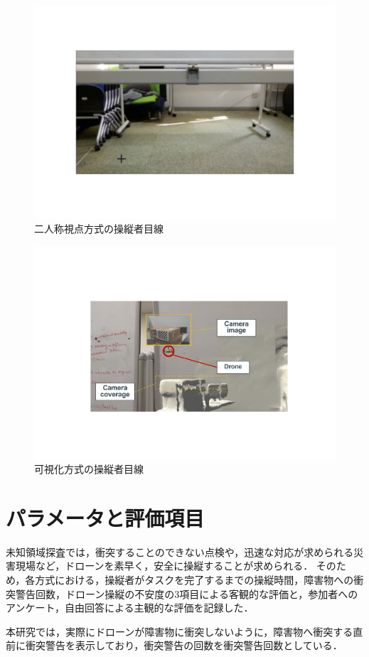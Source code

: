 \documentclass[a4paper,11pt]{ujreport}
\begin{document}
\begin{figure}[!tb]
  \centering
  \includegraphics[width=0.7\linewidth]{img/05_fpv.pdf}
  \caption{二人称視点方式の操縦者目線}
  \label{fig:05_fpv}
\end{figure}

\begin{figure}[!tb]
  \centering
  \includegraphics[width=0.7\linewidth]{img/05_visualization.pdf}
  \caption{可視化方式の操縦者目線}
  \label{fig:05_visualization}
\end{figure}


\section{パラメータと評価項目}
\label{sec:Parametor}

未知領域探査では，衝突することのできない点検や，迅速な対応が求められる災害現場など，ドローンを素早く，安全に操縦することが求められる．
そのため，各方式における，操縦者がタスクを完了するまでの操縦時間，障害物への衝突警告回数，ドローン操縦の不安度の3項目による客観的な評価と，参加者へのアンケート，自由回答による主観的な評価を記録した．

本研究では，実際にドローンが障害物に衝突しないように，障害物へ衝突する直前に衝突警告を表示しており，衝突警告の回数を衝突警告回数としている．
\end{document}
